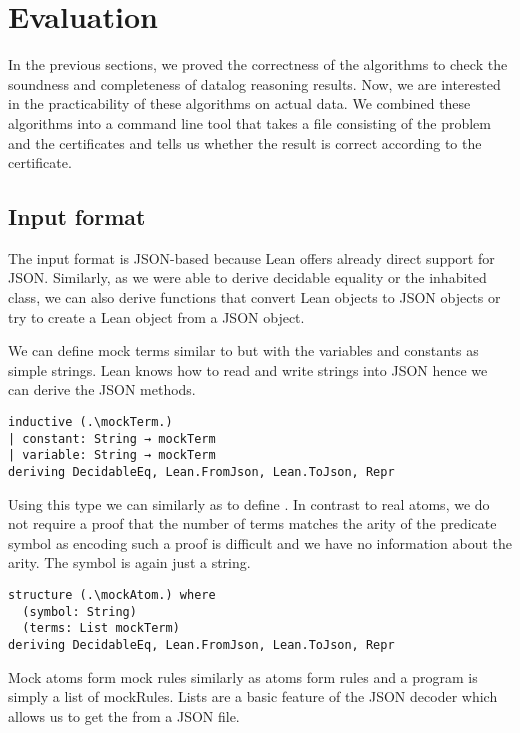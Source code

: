 \chapter{Evaluation}\label{sec:eval}

In the previous sections, we proved the correctness of the algorithms to check the soundness and completeness of datalog reasoning results. Now, we are interested in the practicability of these algorithms on actual data. We combined these algorithms into a command line tool that takes a file consisting of the problem and the certificates and tells us whether the result is correct according to the certificate. 

\section{Input format}

The input format is JSON-based because Lean offers already direct support for JSON. Similarly, as we were able to derive decidable equality or the inhabited class, we can also derive functions that convert Lean objects to JSON objects or try to create a Lean object from a JSON object.

We can define mock terms similar to \term but with the variables and constants as simple strings. Lean knows how to read and write strings into JSON hence we can derive the JSON methods.

\begin{lstlisting}
inductive (.\mockTerm.)
| constant: String → mockTerm
| variable: String → mockTerm
deriving DecidableEq, Lean.FromJson, Lean.ToJson, Repr
\end{lstlisting}

Using this type we can similarly as to \atom define \mockAtom. In contrast to real atoms, we do not require a proof that the number of terms matches the arity of the predicate symbol as encoding such a proof is difficult and we have no information about the arity. The symbol is again just a string.

\begin{lstlisting}
structure (.\mockAtom.) where
  (symbol: String)
  (terms: List mockTerm)
deriving DecidableEq, Lean.FromJson, Lean.ToJson, Repr
\end{lstlisting}

Mock atoms form mock rules similarly as atoms form rules and a program is simply a list of mockRules. Lists are a basic feature of the JSON decoder which allows us to get the from a JSON file. 

